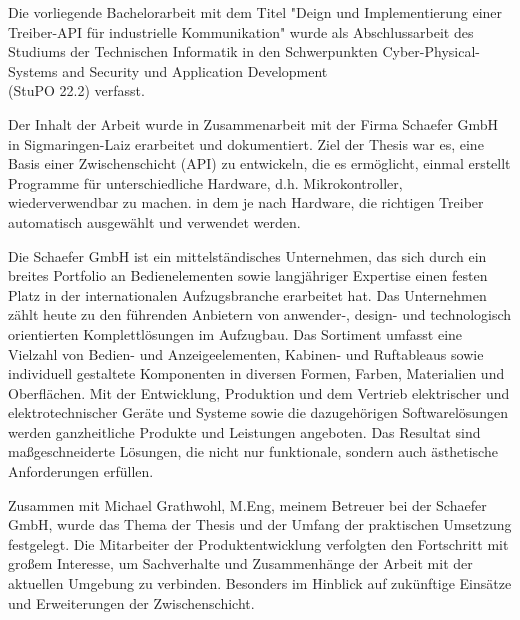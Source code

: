 Die vorliegende Bachelorarbeit mit dem Titel "Deign und Implementierung einer Treiber-API für industrielle Kommunikation" wurde als Abschlussarbeit des Studiums der Technischen Informatik in den Schwerpunkten Cyber-Physical-Systems and Security und Application Development\\ (StuPO 22.2) verfasst.

Der Inhalt der Arbeit wurde in Zusammenarbeit mit der Firma Schaefer GmbH in Sigmaringen-Laiz erarbeitet und dokumentiert.
Ziel der Thesis war es, eine Basis einer Zwischenschicht (API) zu entwickeln, die es ermöglicht, einmal erstellt Programme für unterschiedliche Hardware, d.h. Mikrokontroller, wiederverwendbar zu machen. in dem je nach Hardware, die richtigen Treiber automatisch ausgewählt und verwendet werden.

Die Schaefer GmbH ist ein mittelständisches Unternehmen, das sich durch ein breites Portfolio an Bedienelementen sowie langjähriger Expertise einen festen Platz in der internationalen Aufzugsbranche erarbeitet hat. 
Das Unternehmen zählt heute zu den führenden Anbietern von anwender-, design- und technologisch orientierten Komplettlösungen im Aufzugbau.
Das Sortiment umfasst eine Vielzahl von Bedien- und Anzeigeelementen, Kabinen- und Ruftableaus sowie individuell gestaltete Komponenten in diversen Formen, Farben, Materialien und Oberflächen. 
Mit der Entwicklung, Produktion und dem Vertrieb elektrischer und elektrotechnischer Geräte und Systeme sowie die dazugehörigen Softwarelösungen werden ganzheitliche Produkte und Leistungen angeboten.
Das Resultat sind maßgeschneiderte Lösungen, die nicht nur funktionale, sondern auch ästhetische Anforderungen erfüllen. 

Zusammen mit Michael Grathwohl, M.Eng, meinem Betreuer bei der Schaefer GmbH, wurde das Thema der Thesis und der Umfang der praktischen Umsetzung festgelegt.
Die Mitarbeiter der Produktentwicklung verfolgten den Fortschritt mit großem Interesse, um Sachverhalte und Zusammenhänge der Arbeit mit der aktuellen Umgebung zu verbinden.
Besonders im Hinblick auf zukünftige Einsätze und Erweiterungen der Zwischenschicht.
